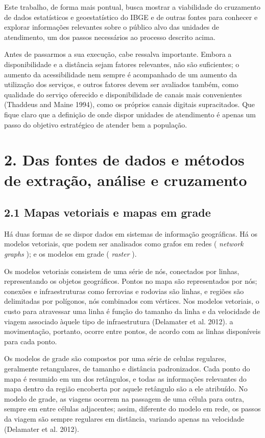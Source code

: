 \documentclass[]{article}
\begin{document}
Este trabalho, de forma mais pontual, busca mostrar a viabilidade do
cruzamento de dados estatísticos e geoestatístico do IBGE e de outras
fontes para conhecer e explorar informações relevantes sobre o público
alvo das unidades de atendimento, um dos passos necessários ao processo
descrito acima.

Antes de passarmos a sua execução, cabe ressalva importante. Embora a
disponibilidade e a distância sejam fatores relevantes, não são
suficientes; o aumento da acessibilidade nem sempre é acompanhado de um
aumento da utilização dos serviços, e outros fatores devem ser avaliados
também, como qualidade do serviço oferecido e disponibilidade de canais
mais convenientes (Thaddeus and Maine 1994), como os próprios canais
digitais supracitados. Que fique claro que a definição de onde dispor
unidades de atendimento é apenas um passo do objetivo estratégico de
atender bem a população.

\hypertarget{das-fontes-de-dados-e-metodos-de-extracao-analise-e-cruzamento}{%
\section{2. Das fontes de dados e métodos de extração, análise e
cruzamento}\label{das-fontes-de-dados-e-metodos-de-extracao-analise-e-cruzamento}}

\hypertarget{mapas-vetoriais-e-mapas-em-grade}{%
\subsection{2.1 Mapas vetoriais e mapas em
grade}\label{mapas-vetoriais-e-mapas-em-grade}}

Há duas formas de se dispor dados em sistemas de informação geográficas.
Há os modelos vetoriais, que podem ser analisados como grafos em redes (
\emph{network graphs} ); e os modelos em grade ( \emph{raster} ).

Os modelos vetoriais consistem de uma série de nós, conectados por
linhas, representando os objetos geográficos. Pontos no mapa são
representados por nós; conexões e infraestruturas como ferrovias e
rodovias são linhas, e regiões são delimitadas por polígonos, nós
combinados com vértices. Nos modelos vetoriais, o custo para atravessar
uma linha é função do tamanho da linha e da velocidade de viagem
associado àquele tipo de infraestrutura (Delamater et al. 2012). a
movimentação, portanto, ocorre entre pontos, de acordo com as linhas
disponíveis para cada ponto.

Os modelos de grade são compostos por uma série de celulas regulares,
geralmente retangulares, de tamanho e distância padronizados. Cada ponto
do mapa é resumido em um dos retângulos, e todas as informações
relevantes do mapa dentro da região encoberta por aquele retângulo são a
ele atribuído. No modelo de grade, as viagens ocorrem na passagem de uma
célula para outra, sempre em entre células adjacentes; assim, diferente
do modelo em rede, os passos da viagem são sempre regulares em
distância, variando apenas na velocidade (Delamater et al. 2012).
\end{document}
